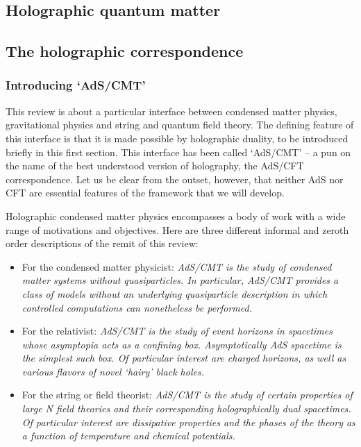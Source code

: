 \documentclass[10pt, oneside]{book}
\begin{document}
\begin{doublespace}
\chapter{Holographic quantum matter}




\section{The holographic correspondence}

\subsection{Introducing `AdS/CMT'}

This review is about a particular interface between condensed matter physics, gravitational physics and string and quantum field theory. The defining feature of this interface is that it is made possible by holographic duality, to be introduced briefly in this first section. This interface has been called `AdS/CMT' -- a pun on the name of the best understood version of holography, the AdS/CFT correspondence. Let us be clear from the outset, however, that neither AdS nor CFT are essential features of the framework that we will develop.

Holographic condensed matter physics encompasses a body of work with a wide range of motivations and objectives. Here are three different informal and zeroth order descriptions of the remit of this review:

\begin{itemize}

\item For the condensed matter physicist: {\it AdS/CMT is the study of condensed matter systems without quasiparticles. In particular, AdS/CMT provides a class of models without an underlying quasiparticle description in which controlled computations can nonetheless be performed.}

\item For the relativist: {\it AdS/CMT is the study of event horizons in spacetimes whose asymptopia acts as a confining box. Asymptotically AdS spacetime is the simplest such box. Of particular interest are charged horizons, as well as various flavors of novel `hairy' black holes.}

\item For the string or field theorist: {\it AdS/CMT is the study of certain properties of large N field theories and their corresponding holographically dual spacetimes. Of particular interest are dissipative properties and the phases of the theory as a function of temperature and chemical potentials.}


\end{itemize}
\end{doublespace}
\end{document}
